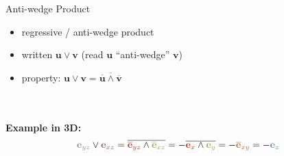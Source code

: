 \begin{frame}{Anti-wedge Product}
    \begin{itemize}
        \item regressive / anti-wedge product
        \item written $\mathbf{{u}} \vee \mathbf{{v}}$ (read $\mathbf{{u}}$ ``anti-wedge'' $\mathbf{{v}}$)
        \item property: $\mathbf{{u}} \vee \mathbf{{v}} = \overline{\overline{\mathbf{u}} \wedge \overline{\mathbf{v}}}$
    \end{itemize}
    ~\\~\\
    \textbf{Example in 3D:}
    $$
        \textcolor{midgreenblue}{\mathbf{e}_{yz}} \vee \textcolor{midredblue}{\mathbf{e}_{xz}}
        = \overline{
            \textcolor{red}{\mathbf{\overline{e}}_{yz}} \wedge
            \textcolor{green}{\mathbf{\overline{e}}_{xz}}
        }
        = -\overline{
            \textcolor{red}{\mathbf{e}_{x}} \wedge
            \textcolor{green}{\mathbf{e}_{y}}
        }
        = -\textcolor{midredgreen}{\mathbf{\overline{e}}_{xy}}
        = -\textcolor{blue}{\mathbf{e}_{z}}
    $$
\end{frame}
